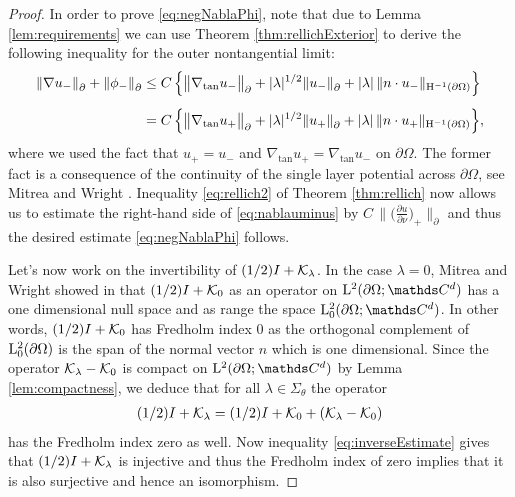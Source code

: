 \begin{proof}
  In order to prove \eqref{eq:negNablaPhi}, note that due to Lemma \ref{lem:requirements} we can use Theorem \ref{thm:rellichExterior} to derive the following inequality for the outer nontangential limit:
  \begin{align}
    \|\nabla u_-\|^{}_\partial + \|\phi_-\|^{}_\partial
    &\leq C\, \Big\{ \big\|\nabla_{\mathrm{tan}} u_- \big\|^{}_\partial + |\lambda|^{1/2} \| u_-\|^{}_\partial + |\lambda|\, \| n \cdot u_-\|_{\mathrm{H}^{-1}(\partial\Omega)} \Big\} \nonumber\\[0.5em]
    \label{eq:nablauminus}
    &= C \, \Big\{ \big\|\nabla_{\mathrm{tan}} u_+ \big\|^{}_\partial + |\lambda|^{1/2} \| u_+ \|^{}_\partial + |\lambda|\, \|n \cdot u_+ \|_{\mathrm{H}^{-1}(\partial\Omega)} \Big\},
  \end{align}
  where we used the fact that $u_+ = u_-$ and $\nabla_{\mathrm{tan}} u_+ = \nabla_{\mathrm{tan}} u_-$ on $\partial\Omega$. The former fact is a consequence of the continuity of the single layer potential across $\partial\Omega$, see Mitrea and Wright \cite[Prop.\@~4.7]{mitreaWright}.
  Inequality \eqref{eq:rellich2} of Theorem \ref{thm:rellich} now allows us to estimate the right-hand side of \eqref{eq:nablauminus} by $C \,\|\big(\frac{\partial u}{\partial \nu} \big)_+ \|^{}_\partial$ and thus the desired estimate \eqref{eq:negNablaPhi} follows.

  Let's now work on the invertibility of $(1/2) I + \mathcal{K}_\lambda$. In the case $\lambda = 0$, Mitrea and Wright showed in \cite[Eq.\@~(5.166)]{mitreaWright} that $(1/2) I + \mathcal{K}_0$ as an operator on $\Ell^2(\partial\Omega; \C^d)$ has a one dimensional null space and as range the space $\Ell_0^2(\partial\Omega; \C^d)$.
  In other words, $(1/2) I + \mathcal{K}_0$ has Fredholm index $0$ as the orthogonal complement of $\mathrm{L}^2_0(\partial\Omega)$ is the span of the normal vector $n$ which is one dimensional.
  Since the operator $\mathcal{K}_\lambda - \mathcal{K}_0$ is compact on $\Ell^2(\partial\Omega; \C^d)$ by Lemma \ref{lem:compactness}, we deduce that for all $\lambda \in \Sigma_\theta$ the operator
  \begin{align*}
    (1/2)I + \mathcal{K}_\lambda = (1/2)I + \mathcal{K}_0 + (\mathcal{K}_\lambda - \mathcal{K}_0)
  \end{align*}
  has the Fredholm index zero as well.
  Now inequality \eqref{eq:inverseEstimate} gives that $(1/2)I + \mathcal{K}_\lambda$ is injective and thus the Fredholm index of zero implies that it is also surjective and hence an isomorphism.
\end{proof}

